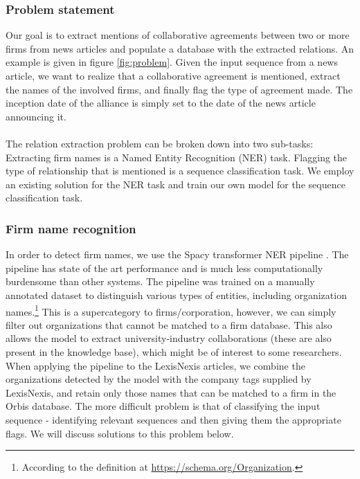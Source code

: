 \subsubsection{Problem statement} 
Our goal is to extract mentions of collaborative agreements between two or more firms from news articles and populate a database with the extracted relations. An example is given in figure \ref{fig:problem}. Given the input sequence from a news article, we want to realize that a collaborative agreement is mentioned, extract the names of the involved firms, and finally flag the type of agreement made. The inception date of the alliance is simply set to the date of the news article announcing it. \\\\
\noindent The relation extraction problem can be broken down into two sub-tasks: Extracting firm names is a Named Entity Recognition (NER) task. Flagging the type of relationship that is mentioned is a sequence classification task. We employ an existing solution for the NER task and train our own model for the sequence classification task.

\subsubsection{Firm name recognition} 
In order to detect firm names, we use the Spacy transformer NER pipeline \citep{spacy2}. The pipeline has state of the art performance and is much less computationally burdensome than other systems. The pipeline was trained on a manually annotated dataset to distinguish various types of entities, including organization names.\footnote{According to the definition at \url{https://schema.org/Organization}.} This is a supercategory to firms/corporation, however, we can simply filter out organizations that cannot be matched to a firm database. This also allows the model to extract university-industry collaborations (these are also present in the knowledge base), which might be of interest to some researchers. When applying the pipeline to the LexisNexis articles, we combine the organizations detected by the model with the company tags supplied by LexisNexis, and retain only those names that can be matched to a firm in the Orbis database.
The more difficult problem is that of classifying the input sequence - identifying relevant sequences and then giving them the appropriate flags. We will discuss solutions to this problem below.

